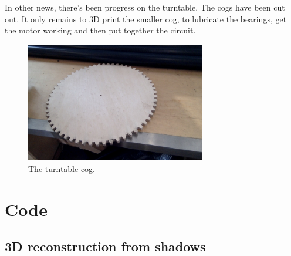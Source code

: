 \documentclass[a4paper]{article}
\begin{document}
In other news, there's been progress on the turntable. 
The cogs have been cut out. 
It only remains to 3D print the smaller cog, to lubricate the bearings, get the motor working and then put together the circuit.

\begin{figure}[H]
  \centering
    \includegraphics[width=0.7\textwidth]{figures/cog.jpg}
    \caption{The turntable cog.}
  \label{fig:f2}
\end{figure}

\newpage
\section{Code}
\subsection{3D reconstruction from shadows}
\label{alg:shadow}

\end{document}
